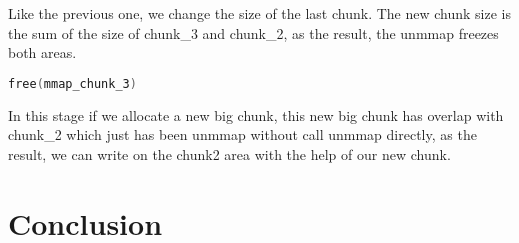 \documentclass{masterthesis}
\begin{document}
Like the previous one, we change the size of the last chunk. The new chunk size is the sum of the size of chunk\_3 and chunk\_2, as the result, the unmmap freezes both areas.

\begin{lstlisting}[language=c,frame=tlrb]
free(mmap_chunk_3)
 \end{lstlisting}
 
In this stage if we allocate a new big chunk, this new big chunk has overlap with chunk\_2 which just has been unmmap without call unmmap directly, as the result, we can write on the chunk2 area with the help of our new chunk.


\chapter{Conclusion}



\end{document}
